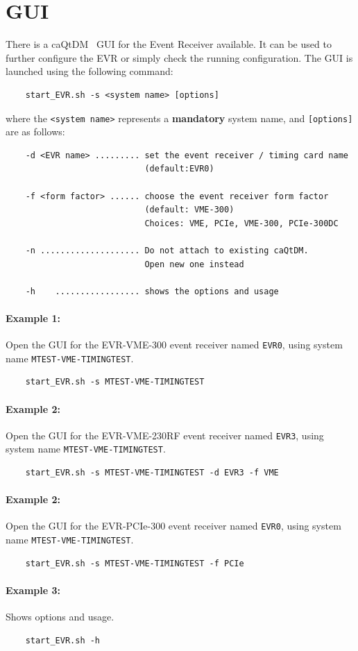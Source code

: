 \documentclass[12pt,a4paper]{article}
\begin{document}
\section{GUI}\label{sec:gui} 
There is a caQtDM~\cite{caqtdm} GUI for the Event Receiver available. It can be used to further configure the EVR or simply check the running configuration. The GUI is launched using the following command:

\begin{verbatim}
	start_EVR.sh -s <system name> [options]
\end{verbatim}
where the \texttt{<system name>} represents a \textbf{mandatory} system name, and \texttt{[options]} are as follows:
\begin{verbatim}
	-d <EVR name> ......... set the event receiver / timing card name 
	                        (default:EVR0)
	
	-f <form factor> ...... choose the event receiver form factor 
	                        (default: VME-300)
	                        Choices: VME, PCIe, VME-300, PCIe-300DC
	
	-n .................... Do not attach to existing caQtDM. 
	                        Open new one instead
	
	-h    ................. shows the options and usage
\end{verbatim}


\paragraph{Example 1:} Open the GUI for the EVR-VME-300 event receiver named \texttt{EVR0}, using system name \texttt{MTEST-VME-TIMINGTEST}.
\begin{verbatim}
	start_EVR.sh -s MTEST-VME-TIMINGTEST
\end{verbatim}

\paragraph{Example 2:} Open the GUI for the EVR-VME-230RF event receiver named \texttt{EVR3}, using system name \texttt{MTEST-VME-TIMINGTEST}.
\begin{verbatim}
	start_EVR.sh -s MTEST-VME-TIMINGTEST -d EVR3 -f VME
\end{verbatim}

\paragraph{Example 2:} Open the GUI for the EVR-PCIe-300 event receiver named \texttt{EVR0}, using system name \texttt{MTEST-VME-TIMINGTEST}.
\begin{verbatim}
	start_EVR.sh -s MTEST-VME-TIMINGTEST -f PCIe
\end{verbatim}

\paragraph{Example 3:} Shows options and usage.
\begin{verbatim}
	start_EVR.sh -h
\end{verbatim}



\end{document}
